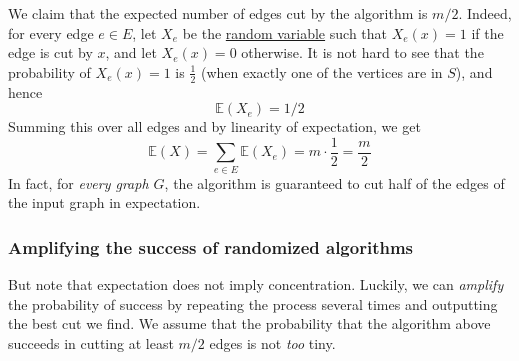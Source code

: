   We claim that the expected number of edges cut by the algorithm is $m/2$. Indeed, for every edge $e \in E$, let $X_e$ be the \hyperref[prob-def:random-variable]{random variable} such that $X_e (x) = 1$ if the edge is cut by $x$, and let $X_e (x) = 0$ otherwise. It is not hard to see that the probability of $X_e (x) = 1$ is $\frac{1}{2}$ (when exactly one of the vertices are in $S$), and hence 
  \begin{equation}
    \mathbb{E} (X_e) = 1/2
  \end{equation}
  Summing this over all edges and by linearity of expectation, we get
  \begin{equation}
    \mathbb{E}(X) = \sum_{e \in E} \mathbb{E}(X_e) = m \cdot \frac{1}{2} = \frac{m}{2}
  \end{equation}
  In fact, for \textit{every graph $G$}, the algorithm is guaranteed to cut half of the edges of the input graph in expectation. 

\subsubsection{Amplifying the success of randomized algorithms}

  But note that expectation does not imply concentration. Luckily, we can \textit{amplify} the probability of success by repeating the process several times and outputting the best cut we find. We assume that the probability that the algorithm above succeeds in cutting at least $m/2$ edges is not \textit{too} tiny. 

